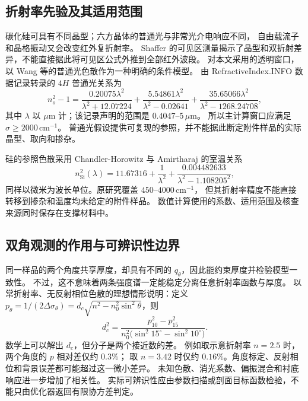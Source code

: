 \subsection{折射率先验及其适用范围}
碳化硅可具有不同晶型；六方晶体的普通光与非常光介电响应不同，
自由载流子和晶格振动又会改变红外复折射率\cite{Lindquist2004}。
Shaffer 的可见区测量揭示了晶型和双折射差异，不能直接据此将可见区公式外推到全部红外波段\cite{Shaffer1971}。
对本文采用的透明窗口，以 Wang 等的普通光色散作为一种明确的条件模型\cite{Wang2013}。
由 RefractiveIndex.INFO 数据记录转录的 $4H$ 普通光关系为\cite{Polyanskiy2024}
\begin{equation}
 n_o^2-1=
 \frac{0.20075\lambda^2}{\lambda^2+12.07224}
 +\frac{5.54861\lambda^2}{\lambda^2-0.02641}
 +\frac{35.65066\lambda^2}{\lambda^2-1268.24708},
 \label{eq:wang-sic}
\end{equation}
其中 $\lambda$ 以 $\mu\mathrm{m}$ 计；该记录声明的范围是 $0.4047$--$5\,\mu\mathrm{m}$。
所以主计算窗口应满足 $\sigma\geq2000\,\mathrm{cm}^{-1}$。
普通光假设提供可复现的参照，并不能据此断定附件样品的实际晶型、取向和掺杂。

硅的参照色散采用 Chandler-Horowitz 与 Amirtharaj 的室温关系\cite{ChandlerHorowitz2005}
\begin{equation}
 n_{\mathrm{Si}}^2(\lambda)=11.67316+\frac{1}{\lambda^2}
 +\frac{0.004482633}{\lambda^2-1.108205^2},
 \label{eq:silicon-index}
\end{equation}
同样以微米为波长单位。原研究覆盖 $450$--$4000\,\mathrm{cm}^{-1}$，
但其折射率精度不能直接转移到掺杂和温度均未给定的附件样品。
数值计算使用的系数、适用范围及核查来源同时保存在支撑材料中。

\subsection{双角观测的作用与可辨识性边界}
同一样品的两个角度共享厚度，却具有不同的 $q_\theta$，因此能约束厚度并检验模型一致性。
不过，这不意味着两条强度谱一定能稳定分离任意折射率函数与厚度。
以常折射率、无反射相位色散的理想情形说明：定义
$p_\theta=1/(2\Delta\sigma_\theta)=d_c\sqrt{n^2-n_0^2\sin^2\theta}$，则
\begin{equation}
 d_c^2=\frac{p_{10}^2-p_{15}^2}
 {n_0^2\big(\sin^2 15^\circ-\sin^2 10^\circ\big)}.
 \label{eq:two-angle-identifiability}
\end{equation}
数学上可以解出 $d_c$，但分子是两个接近数的差。
例如取示意折射率 $n=2.5$ 时，两个角度的 $p$ 相对差仅约 $0.3\%$；
取 $n=3.42$ 时仅约 $0.16\%$。角度标定、反射相位和背景误差都可能超过这一微小差异。
未知色散、消光系数、偏振混合和衬底响应进一步增加了相关性。
实际可辨识性应由参数扫描或剖面目标函数检验，不能只由优化器返回有限协方差判定\cite{Raue2009}。

